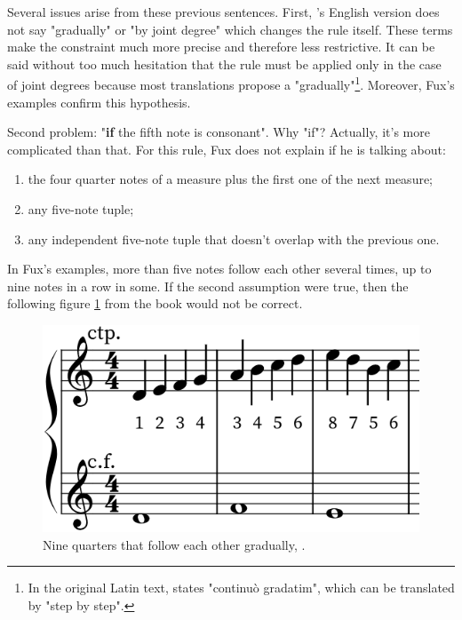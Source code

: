 \begin{enumerate}[wide, label=\bfseries 3.H\arabic*]
    Several issues arise from these previous sentences. First, \citeauthor{GaPEng}'s English version does not say "gradually" or "by joint degree" which changes the rule itself. These terms make the constraint much more precise and therefore less restrictive. It can be said without too much hesitation that the rule must be applied only in the case of joint degrees because most translations propose a "gradually"\footnote{In the original Latin text, \textcite[p.63]{IMSLPlatin} states "continuò gradatim", which can be translated by "step by step".}. Moreover, Fux's examples confirm this hypothesis.

    Second problem: "\textbf{if} the fifth note is consonant". Why "if"? Actually, it's more complicated than that. For this rule, Fux does not explain if he is talking about:
    \begin{enumerate}
        \item the four quarter notes of a measure plus the first one of the next measure;
        \item any five-note tuple;
        \item any independent five-note tuple that doesn't overlap with the previous one.
    \end{enumerate}
    
    In Fux's examples, more than five notes follow each other several times, up to nine notes in a row in some. If the second assumption were true, then the following figure \ref{fig:nineiar} from the book would not be correct.
    \begin{figure}[h]
        \centering
        \includegraphics[height=\fh]{Images/nine_quarters.png}
        \caption{Nine quarters that follow each other gradually, .}
        \label{fig:nineiar}
    \end{figure}


\end{enumerate}
